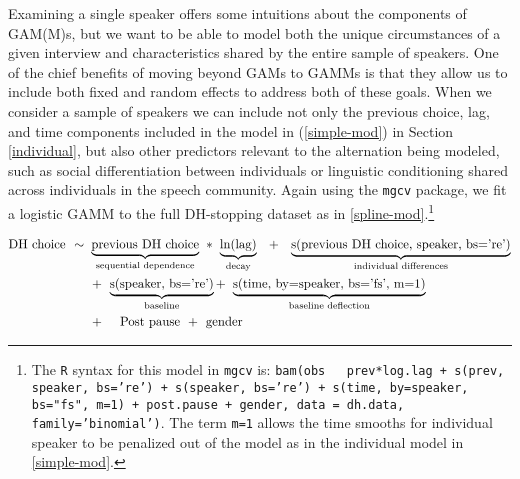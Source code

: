 \documentclass[12pt]{article}
\begin{document}
Examining a single speaker offers some intuitions about the components of GAM(M)s, but we want to be able to model both the unique circumstances of a given interview and characteristics shared by the entire sample of speakers. One of the chief benefits of moving beyond GAMs to GAMMs is that they allow us to include both fixed and random effects to address both of these goals. When we consider a sample of speakers we can include not only the previous choice, lag, and time components included in the model in (\ref{simple-mod}) in Section \ref{individual}, but also   other predictors relevant to the alternation being modeled, such as social differentiation between individuals or linguistic conditioning shared across individuals in the speech community. Again using the \texttt{mgcv} package, we fit a logistic GAMM to the full DH-stopping dataset as in \eqref{spline-mod}.\footnote{The \texttt{R} syntax for this model in \texttt{mgcv} is: \texttt{bam(obs ~ prev*log.lag + s(prev, speaker, bs='re') + s(speaker, bs='re') + s(time, by=speaker, bs="fs", m=1) + post.pause + gender, data = dh.data, family='binomial')}. The term \texttt{m=1} allows the  time smooths for individual speaker to be penalized out of the model as in the individual model in \eqref{simple-mod}.}

\begin{equation} \label{spline-mod}
\begin{split}
  \text{DH choice} 
  \hspace{4pt} \sim \hspace{4pt} 
  & \underbrace{\text{previous DH choice}}_{\text{sequential dependence}}
  \hspace{4pt} * \hspace{4pt} 
  \underbrace{\text{ln(lag)}}_{\text{decay}}
  \hspace{8pt} + \hspace{8pt} 
   \underbrace{\text{s(previous DH choice, speaker, bs='re')}}_{\text{individual differences}} \\
   & + \hspace{4pt} \underbrace{\text{s(speaker, bs='re')}}_{\substack{\text{baseline}}}
   + \hspace{4pt} \underbrace{\text{s(time, by=speaker, bs='fs', m=1)}}_{\substack{\text{baseline deflection}}} \\
  & + \hspace{8pt} 
  \hspace{4pt} \text{Post pause} \hspace{4pt}
  + \hspace{4pt} 
    \text{gender} 
 \hspace{4pt}
  \end{split}
  \vspace{12pt}
\end{equation}
\end{document}
